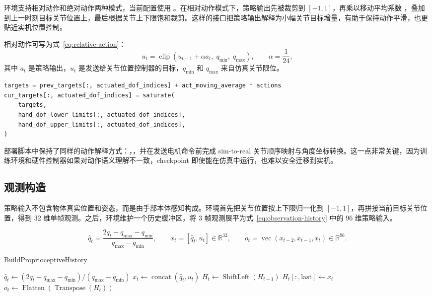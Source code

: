 环境支持相对动作和绝对动作两种模式，当前配置使用 。在相对动作模式下，策略输出先被裁剪到 $[-1,1]$，再乘以移动平均系数 ，叠加到上一时刻目标关节位置上，最后根据关节上下限饱和裁剪。这样的接口把策略输出解释为小幅关节目标增量，有助于保持动作平滑，也更贴近实机位置控制。

相对动作可写为式~\eqref{eq:relative-action}：
\begin{equation}
\label{eq:relative-action}
    u_t=\operatorname{clip}\left(u_{t-1}+\alpha a_t,\;q_{\min},\;q_{\max}\right),
    \qquad \alpha=\frac{1}{24},
\end{equation}
其中 $a_t$ 是策略输出，$u_t$ 是发送给关节位置控制器的目标，$q_{\min}$ 和 $q_{\max}$ 来自仿真关节限位。

\begin{lstlisting}[language=Python, caption={相对动作更新的核心逻辑}]
targets = prev_targets[:, actuated_dof_indices] + act_moving_average * actions
cur_targets[:, actuated_dof_indices] = saturate(
    targets,
    hand_dof_lower_limits[:, actuated_dof_indices],
    hand_dof_upper_limits[:, actuated_dof_indices],
)
\end{lstlisting}

部署脚本中保持了同样的动作解释方式：，，并在发送电机命令前完成 sim-to-real 关节顺序映射与角度坐标转换。这一点非常关键，因为训练环境和硬件控制器如果对动作语义理解不一致，checkpoint 即使能在仿真中运行，也难以安全迁移到实机。

\subsection{观测构造}

策略输入不包含物体真实位置和姿态，而是由手部本体感知构成。环境首先把关节位置按上下限归一化到 $[-1,1]$，再拼接当前目标关节位置，得到 32 维单帧观测。之后，环境维护一个历史缓冲区，将 3 帧观测展平为式~\eqref{eq:observation-history} 中的 96 维策略输入。

\begin{equation}
\label{eq:observation-history}
    \hat{q}_t=\frac{2q_t-q_{\max}-q_{\min}}{q_{\max}-q_{\min}},
    \qquad
    x_t=[\hat{q}_t,u_t]\in\mathbb{R}^{32},
    \qquad
    o_t=\operatorname{vec}(x_{t-2},x_{t-1},x_t)\in\mathbb{R}^{96}.
\end{equation}

\begin{algorithm}[H]
\DontPrintSemicolon
\caption{BuildProprioceptiveHistory}
\BlankLine
$\hat{q}_t \leftarrow (2q_t-q_{\max}-q_{\min})/(q_{\max}-q_{\min})$
$x_t \leftarrow \operatorname{concat}(\hat{q}_t,u_t)$
$H_t \leftarrow \operatorname{ShiftLeft}(H_{t-1})$\;
$H_t[:,\mathrm{last}] \leftarrow x_t$\;
$o_t \leftarrow \operatorname{Flatten}(\operatorname{Transpose}(H_t))$\;
\;
\end{algorithm}


